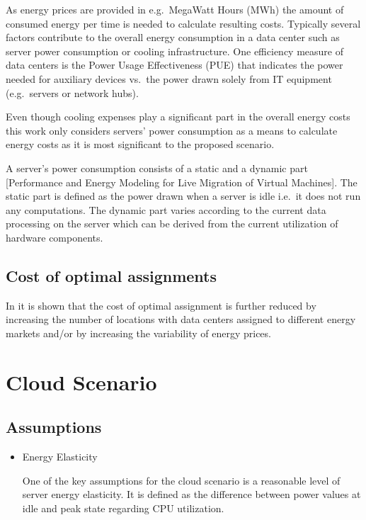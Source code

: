 As energy prices are provided in e.g.~MegaWatt Hours (MWh) the amount of consumed energy per time is needed to calculate resulting costs. Typically several factors contribute to the overall energy consumption in a data center such as server power consumption or cooling infrastructure. One efficiency measure of data centers is the Power Usage Effectiveness (PUE) that indicates the power needed for auxiliary devices vs.~the power drawn solely from IT equipment (e.g.~servers or network hubs). 

Even though cooling expenses play a significant part in the overall energy costs this work only considers servers' power consumption as a means to calculate energy costs as it is most significant to the proposed scenario. 

A server's power consumption consists of a static and a dynamic part [Performance and Energy Modeling for Live Migration of Virtual Machines]. The static part is defined as the power drawn when a server is idle i.e.~it does not run any computations. The dynamic part varies according to the current data processing on the server which can be derived from the current utilization of hardware components. 


\subsection{Cost of optimal assignments}


In \cite{de2013study} it is shown that the cost of optimal assignment is further reduced by increasing the number of locations with data centers assigned to different energy markets and/or by increasing the variability of energy prices. 


\section{Cloud Scenario}

\subsection{Assumptions}

\begin{itemize}

\item Energy Elasticity

One of the key assumptions for the cloud scenario is a reasonable level of server energy elasticity. It is defined as the difference between power values at idle and peak state regarding CPU utilization. 

\end{itemize}


